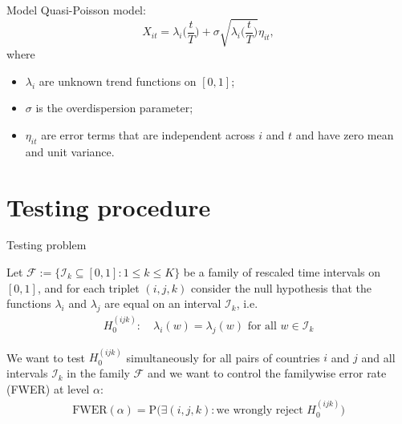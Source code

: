 \documentclass[10pt]{beamer}
\newcommand{\Prob}{\mathrm{P}}
\begin{document}
\begin{frame}{Model}
Quasi-Poisson model:
\begin{equation*}
X_{it} = \lambda_i \Big( \frac{t}{T} \Big) + \sigma\sqrt{\lambda_i \Big( \frac{t}{T} \Big)} \eta_{it},
\end{equation*}\pause
\vspace{-3mm}
where
\begin{itemize}
\item $\lambda_i$ are unknown trend functions on $[0,1]$;\pause
\item $\sigma$ is the overdispersion parameter;\pause
\item $\eta_{it}$ are error terms that are independent across $i$ and $t$ and have zero mean and unit variance.
\end{itemize}
\end{frame}

\section{Testing procedure}
\begin{frame}{Testing problem}

Let $\mathcal{F} :=\{ \mathcal{I}_k \subseteq [0, 1]: 1 \le k \le K\}$ be a family of rescaled time intervals on $[0, 1]$, and for each triplet $(i, j, k)$ consider the null hypothesis that the functions $\lambda_i$ and $\lambda_j$ are equal on an interval $\mathcal{I}_k$\pause, i.e.
\begin{align*}
H_0^{(ijk)}:\quad  \lambda_i(w) = \lambda_j(w) \text{ for all } w\in \mathcal{I}_k
\end{align*}\pause
\vspace{-2mm}

We want to test $H_0^{(ijk)}$ simultaneously for all pairs of countries $i$ and $j$ and all intervals $\mathcal{I}_k$ in the family $\mathcal{F}$ and we want to control the familywise error rate (FWER) at level $\alpha$\pause:
\begin{align*}
\text{FWER}(\alpha) = \Prob \Big( \exists (i,j,k): \text{we wrongly reject } H_0^{(ijk)} \Big)
\end{align*}
\end{frame} 
\end{document}
